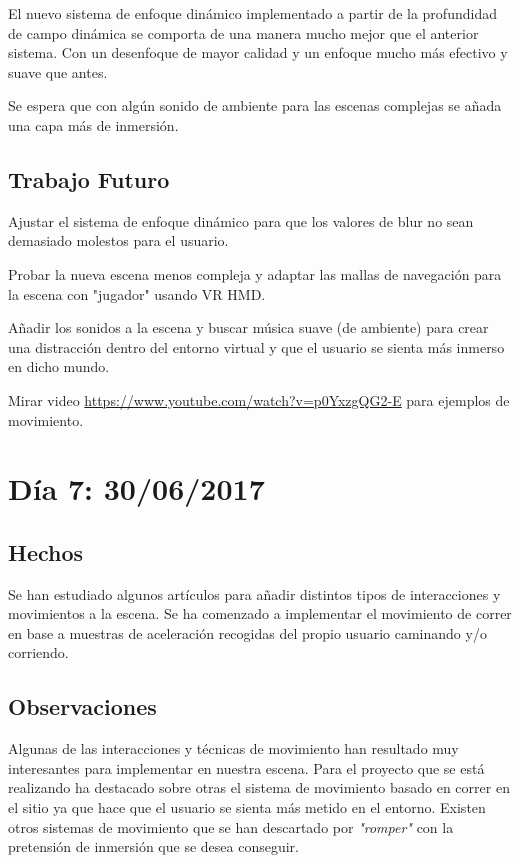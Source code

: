 \documentclass[12pt,a4paper]{article}
\begin{document}
El nuevo sistema de enfoque dinámico implementado a partir de la profundidad de campo dinámica se comporta de una manera mucho mejor que el anterior sistema. Con un desenfoque de mayor calidad y un enfoque mucho más efectivo y suave que antes.

Se espera que con algún sonido de ambiente para las escenas complejas se añada una capa más de inmersión.

\subsection{Trabajo Futuro}

Ajustar el sistema de enfoque dinámico para que los valores de blur no sean demasiado molestos para el usuario.

Probar la nueva escena menos compleja y adaptar las mallas de navegación para la escena con "jugador" usando VR HMD.

Añadir los sonidos a la escena y buscar música suave (de ambiente) para crear una distracción dentro del entorno virtual y que el usuario se sienta más inmerso en dicho mundo.

Mirar video \url{https://www.youtube.com/watch?v=p0YxzgQG2-E} para ejemplos de movimiento.

\section{Día 7: 30/06/2017}

\subsection{Hechos}

Se han estudiado algunos artículos para añadir distintos tipos de interacciones y movimientos a la escena.
Se ha comenzado a implementar el movimiento de correr en base a muestras de aceleración recogidas del propio usuario caminando y/o corriendo.

\subsection{Observaciones}

Algunas de las interacciones y técnicas de movimiento han resultado muy interesantes para implementar en nuestra escena. Para el proyecto que se está realizando ha destacado sobre otras el sistema de movimiento basado en correr en el sitio ya que hace que el usuario se sienta más metido en el entorno.
Existen otros sistemas de movimiento que se han descartado por \textit{"romper"} con la pretensión de inmersión que se desea conseguir.
\end{document}
